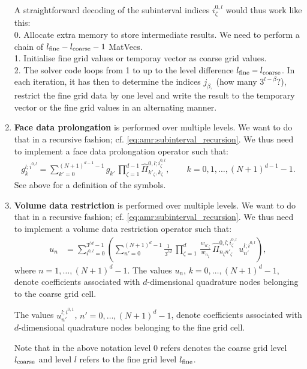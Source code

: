 \documentclass{scrreprt}
\theoremstyle{definition}
\theoremstyle{nonumberplain}
\begin{document}
\begin{enumerate}
A straightforward decoding of the subinterval indices
$i^{0,l}_\zeta$
would thus work like this:
\\
0. Allocate extra memory to store intermediate results.
We need to perform a chain of $l_\textup{fine}-l_\textup{coarse}-1$ MatVecs.
\\
1. Initialise fine grid values or temporay vector as coarse grid values.
\\
2. The solver code loops from 1 to up to the level
difference $l_\textup{fine}-l_\textup{coarse}$.
In each iteration, it has then to determine the 
indices $j_{\beta,}$ (how many $3^{l-\beta}$?), restrict the fine grid data by
one level and write the result to
the temporary vector or the fine grid values
in an alternating manner.
\item \textbf{Face data prolongation} is performed over multiple levels.
We want to do that in a recursive fashion; cf.
\eqref{eq:amr:subinterval_recursion}.
We thus need to implement a face data prolongation operator such that:
\begin{align}
g^{l;i^{0,l}}_k = \sum_{k'=0}^{(N+1)^{d-1}-1} g_{k'}\,\prod_{\zeta=1}^{d-1}
\hat{\Pi}^{0,l;i^{0,l}_\zeta}_{k'_\zeta,k_\zeta},\qquad k =
0,1,\ldots,(N+1)^{d-1}-1.
\end{align}
See above for a definition of the symbols.

\item \textbf{Volume data restriction} is performed over multiple levels. 
We want to do that in a recursive fashion; cf.
\eqref{eq:amr:subinterval_recursion}.
We thus need to implement a volume  data restriction operator such that:
\begin{align}
u_n &=
\sum_{i^{0,l}=0}^{3^{l\,d}-1}
\left(
\sum_{n'=0}^{(N+1)^{d}-1}
\frac{1}{3^{l\,d}}\,
\prod_{\zeta=1}^{d}\,
\frac{w_{n'_\zeta}}{w_{n_\zeta}}\,
\hat{\Pi}^{0,l;i^{0,l}_\zeta}_{n_\zeta n'_\zeta}
\,
u^{l;i^{0,l}}_{n'}
\right)
,
\end{align}
where $n=1,\ldots,(N+1)^{d}-1$.
The values $u_{n}$, $k=0,\ldots,(N+1)^{d}-1$, denote coefficients
associated with $d$-dimensional quadrature nodes belonging to the coarse grid
cell.

The values $u^{l;i^{0,1}}_{n'}$, $n'=0,\ldots,(N+1)^{d}-1$, denote
coefficients associated with $d$-dimensional quadrature nodes belonging 
to the fine grid cell. 

Note that in the above notation level 0 refers
denotes the coarse grid level $l_\textup{coarse}$ and level $l$ refers to
the fine grid level $l_\textup{fine}$.


\end{enumerate}
\end{document}
